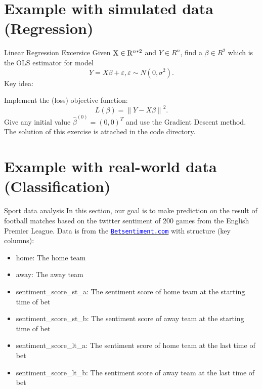 \documentclass{beamer}
\begin{document}
\section{Example with simulated data (Regression)}

\begin{frame}[fragile]{Linear Regression Excersice}
Given ${\rm{X}} \in {{\rm{R}}^{n * 2}}$ and $Y \in {R^n}$, find a $\beta  \in {R^2}$ which is the OLS estimator for model 
\begin{equation*}
Y = X\beta  + \varepsilon ,\varepsilon  \sim N\left( {0,{\sigma ^2}} \right).
\end{equation*}
Key idea:
\par
Implement the (loss) objective function:
\begin{equation*}
L\left( \beta  \right) = {\left\| {Y - X\beta } \right\|^2}.
\end{equation*}
Give any initial value ${{\hat \beta }^{\left( 0 \right)}} = {\left( {0,0} \right)^T}$ and use the Gradient Descent method. The solution of this exercise is attached in the code directory. 
\end{frame}

\section{Example with real-world data (Classification)}

\begin{frame}[fragile]{Sport data analysis}
In this section, our goal is to make prediction on the result of football matches based on the twitter sentiment of 200 games from the English Premier League. Data is from the \href{https://betsentiment.com/}{\tt \textcolor{blue}{Betsentiment.com}} with structure (key columns):
\begin{itemize} 
	\item home: The home team
	\item away: The away team
	\item sentiment\_score\_st\_a: The sentiment score of home team at the starting time of bet
	\item sentiment\_score\_st\_b: The sentiment score of away team at the starting time of bet
	\item sentiment\_score\_lt\_a: The sentiment score of home team at the last time of bet
	\item sentiment\_score\_lt\_b: The sentiment score of away team at the last time of bet
\end{itemize}
\end{frame}
\end{document}
